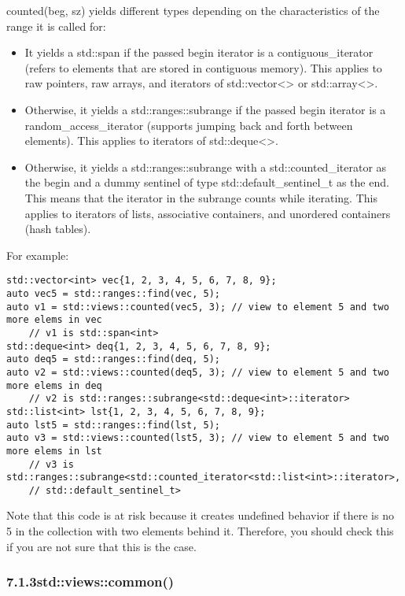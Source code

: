 counted(beg, sz) yields different types depending on the characteristics of the range it is called for:

\begin{itemize}
\item
It yields a std::span if the passed begin iterator is a contiguous\_iterator (refers to elements that are stored in contiguous memory). This applies to raw pointers, raw arrays, and iterators of std::vector<> or std::array<>.

\item
Otherwise, it yields a std::ranges::subrange if the passed begin iterator is a random\_access\_iterator (supports jumping back and forth between elements). This applies to iterators of std::deque<>.

\item
Otherwise, it yields a std::ranges::subrange with a std::counted\_iterator as the begin and a dummy sentinel of type std::default\_sentinel\_t as the end. This means that the iterator in the subrange counts while iterating. This applies to iterators of lists, associative containers, and unordered containers (hash tables).
\end{itemize}

For example:

\begin{lstlisting}[style=styleCXX]
std::vector<int> vec{1, 2, 3, 4, 5, 6, 7, 8, 9};
auto vec5 = std::ranges::find(vec, 5);
auto v1 = std::views::counted(vec5, 3); // view to element 5 and two more elems in vec
	// v1 is std::span<int>
std::deque<int> deq{1, 2, 3, 4, 5, 6, 7, 8, 9};
auto deq5 = std::ranges::find(deq, 5);
auto v2 = std::views::counted(deq5, 3); // view to element 5 and two more elems in deq
	// v2 is std::ranges::subrange<std::deque<int>::iterator>
std::list<int> lst{1, 2, 3, 4, 5, 6, 7, 8, 9};
auto lst5 = std::ranges::find(lst, 5);
auto v3 = std::views::counted(lst5, 3); // view to element 5 and two more elems in lst
	// v3 is std::ranges::subrange<std::counted_iterator<std::list<int>::iterator>,
	// std::default_sentinel_t>
\end{lstlisting}

Note that this code is at risk because it creates undefined behavior if there is no 5 in the collection with two elements behind it. Therefore, you should check this if you are not sure that this is the case.

\subsubsection*{ 7.1.3\hspace{0.2cm}std::views::common()}

